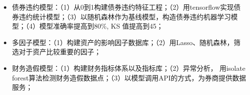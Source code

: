 \documentclass{resume}
\begin{document}
\begin{onehalfspacing}
\begin{itemize}
  \item 债券违约模型：（1）从0到1构建债券违约特征工程；（2）用tensorflow实现债券违约统计模型；（3）以随机森林作为基线模型，构造债券违约机器学习模型；（4）模型准确率提高到80\%, KS 值提高到45；
  \item 多因子模型：（1）构建资产的影响因子数据库；（2）用Lasso、随机森林，筛选对于资产比较重要的因子；	 
  \item 财务造假模型：（1）构建财务指标体系以及指标库；（2）异常分析， 用isolate forest算法检测财务造假数据点；（3）以模型调用API的方式，为券商提供数据服务；
\end{itemize}
\end{onehalfspacing}
\end{document}
